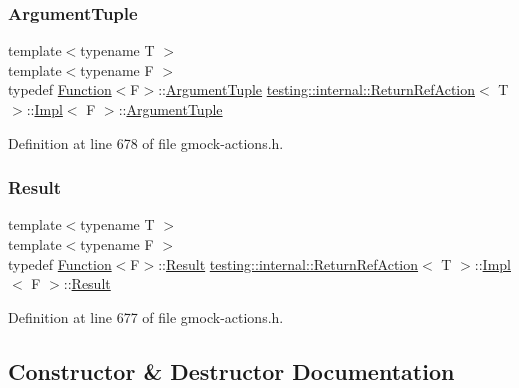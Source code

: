 \subsubsection{\texorpdfstring{Argument\+Tuple}{ArgumentTuple}}
{\footnotesize\ttfamily template$<$typename T $>$ \\
template$<$typename F $>$ \\
typedef \hyperlink{structtesting_1_1internal_1_1Function}{Function}$<$F$>$\+::\hyperlink{classtesting_1_1ActionInterface_af72720d864da4d606629e83edc003511}{Argument\+Tuple} \hyperlink{classtesting_1_1internal_1_1ReturnRefAction}{testing\+::internal\+::\+Return\+Ref\+Action}$<$ T $>$\+::\hyperlink{classtesting_1_1internal_1_1ReturnRefAction_1_1Impl}{Impl}$<$ F $>$\+::\hyperlink{classtesting_1_1ActionInterface_af72720d864da4d606629e83edc003511}{Argument\+Tuple}}



Definition at line 678 of file gmock-\/actions.\+h.

\mbox{\label{classtesting_1_1internal_1_1ReturnRefAction_1_1Impl_a9d55719e344507c0579150cdf307c8bc}} 
\subsubsection{\texorpdfstring{Result}{Result}}
{\footnotesize\ttfamily template$<$typename T $>$ \\
template$<$typename F $>$ \\
typedef \hyperlink{structtesting_1_1internal_1_1Function}{Function}$<$F$>$\+::\hyperlink{classtesting_1_1ActionInterface_a7477de2fe3e4e01c59db698203acaee7}{Result} \hyperlink{classtesting_1_1internal_1_1ReturnRefAction}{testing\+::internal\+::\+Return\+Ref\+Action}$<$ T $>$\+::\hyperlink{classtesting_1_1internal_1_1ReturnRefAction_1_1Impl}{Impl}$<$ F $>$\+::\hyperlink{classtesting_1_1ActionInterface_a7477de2fe3e4e01c59db698203acaee7}{Result}}



Definition at line 677 of file gmock-\/actions.\+h.



\subsection{Constructor \& Destructor Documentation}
\mbox{\label{classtesting_1_1internal_1_1ReturnRefAction_1_1Impl_a245d797a18ba609ce99bc5a383d6c36f}} 
